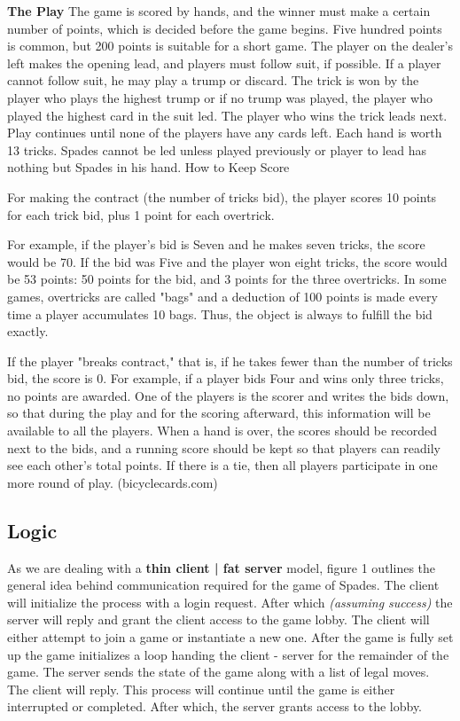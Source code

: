 \textbf{The Play}\newline
The game is scored by hands, and the winner must make a certain number of points, which is decided before the game begins. Five hundred points is common, but 200 points is suitable for a short game. The player on the dealer's left makes the opening lead, and players must follow suit, if possible. If a player cannot follow suit, he may play a trump or discard. The trick is won by the player who plays the highest trump or if no trump was played, the player who played the highest card in the suit led. The player who wins the trick leads next. Play continues until none of the players have any cards left. Each hand is worth 13 tricks. Spades cannot be led unless played previously or player to lead has nothing but Spades in his hand.
How to Keep Score

For making the contract (the number of tricks bid), the player scores 10 points for each trick bid, plus 1 point for each overtrick.

For example, if the player's bid is Seven and he makes seven tricks, the score would be 70. If the bid was Five and the player won eight tricks, the score would be 53 points: 50 points for the bid, and 3 points for the three overtricks. In some games, overtricks are called "bags" and a deduction of 100 points is made every time a player accumulates 10 bags. Thus, the object is always to fulfill the bid exactly.

If the player "breaks contract," that is, if he takes fewer than the number of tricks bid, the score is 0. For example, if a player bids Four and wins only three tricks, no points are awarded.
One of the players is the scorer and writes the bids down, so that during the play and for the scoring afterward, this information will be available to all the players. When a hand is over, the scores should be recorded next to the bids, and a running score should be kept so that players can readily see each other's total points. If there is a tie, then all players participate in one more round of play. (bicyclecards.com)

\subsection{Logic}

As we are dealing with a \textbf{thin client | fat server} model, figure 1 outlines the general idea behind communication required for the game of Spades. The client will initialize the process with a login request. After which \textit{(assuming success)} the server will reply and grant the client access to the game lobby. The client will either attempt to join a game or instantiate a new one. After the game is fully set up the game initializes a loop handing the client - server for the remainder of the game. The server sends the state of the game along with a list of legal moves. The client will reply. This process will continue until the game is either interrupted or completed. After which, the server grants access to the lobby.  	


